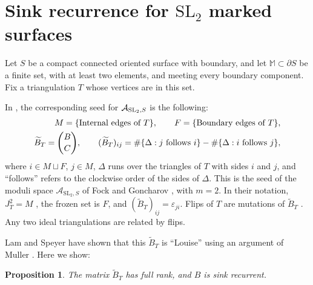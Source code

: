 \documentclass[12pt, letter]{amsart}
\newtheorem{proposition}[dummy]{Proposition}
\theoremstyle{definition}
\begin{document}
\section{Sink recurrence for $\mathrm{SL}_2$ marked surfaces}\label{app:surfaces}

Let $S$ be a compact connected oriented surface with boundary, and let $\mathbb M\subset\partial S$ be a finite set, with at least two elements, and meeting every boundary component.  Fix a triangulation \(T\) whose vertices are in this set.

In \cite{FG06}, the corresponding seed for $\mathcal{A}_{\mathrm{SL}_2, S}$ is the following: 
\begin{align}\label{eq:surface-B}
M = \{\text{Internal edges of } T\}, \qquad F = \{ \text{Boundary edges of } T\}, \notag
\\
 \widetilde B_T=\binom BC,\qquad
 (\widetilde B_T)_{ij}=\#\{\Delta: j\text{ follows }i\}-\#\{\Delta: i\text{ follows }j\},
\end{align}
where $i\in M\sqcup F$, $j\in M$, $\Delta$ runs over the triangles of $T$ with sides $i$ and $j$, and ``follows'' refers to the clockwise order of the sides of $\Delta$.
This is the seed of the moduli space $\mathcal A_{\mathrm{SL}_2,S}$ of Fock and Goncharov \cite[Definition~1.11 and Section~10.2]{FG06}, with $m=2$.
In their notation, $J^2_T=M$ \cite[Figure~1.6]{FG06}, the frozen set is $F$, and $(\widetilde B_T)_{ij}=\varepsilon_{ji}$.
Flips of $T$ are mutations of $\widetilde B_T$ \cite[Section~10.3 and Proposition~10.1]{FG06}. Any two ideal triangulations are related by flips. %




Lam and Speyer have shown that this $\widetilde{B}_T$ is ``Louise'' \cite[Theorem~1.3]{Lam-Speyer} using an argument of Muller \cite[Theorems~10.5--10.6]{M}. Here we show:   



\begin{proposition}\label{prop:surface}
The matrix $\widetilde B_T$ has full rank, and $B$ is sink recurrent.
\end{proposition}
\end{document}
